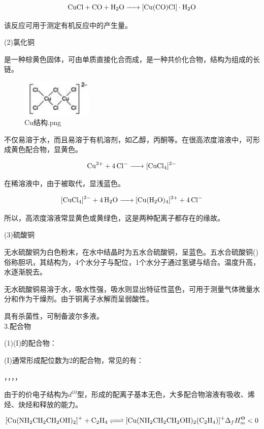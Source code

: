 \documentclass[a4paper,UTF8]{article}
\begin{document}
$$ \ce{CuCl + CO + H2O -> [Cu(CO)Cl]\cdot H2O} $$

该反应可用于测定有机反应中的产生量。

(2)氯化铜

是一种棕黄色固体，可由单质直接化合而成，是一种共价化合物，结构为组成的长链。

\begin{figure}[ht]
	\centering
	\includegraphics[width=0.3\textwidth]{figure//Cu结构.png}
	\caption{Cu结构.png}
	\label{fig:Cu结构}
\end{figure}

不仅易溶于水，而且易溶于有机溶剂，如乙醇，丙酮等。在很高浓度溶液中，可形成黄色配合物，显黄色。

$$ \ce{Cu^{2+} + 4Cl- -> [CuCl4]^{2-}} $$

在稀溶液中，由于被取代，显浅蓝色。

$$ \ce{[CuCl4]^{2-} + 4H2O -> [Cu(H2O)4]^{2+} + 4Cl-} $$

所以，高浓度溶液常显黄色或黄绿色，这是两种配离子都存在的缘故。

(3)硫酸铜

无水硫酸铜为白色粉末，在水中结晶时为五水合硫酸铜，呈蓝色。五水合硫酸铜()俗称胆巩，其结构为，4个水分子与配位，1个水分子通过氢键与结合。温度升高，水逐渐脱去。

无水硫酸铜易溶于水，吸水性强，吸水则显出特征性蓝色，可用于测量气体微量水分和作为干燥剂。由于铜离子水解而呈弱酸性。

具有杀菌性，可制备波尔多液。\\

3.配合物

(1)(I)的配合物：

(I)通常形成配位数为2的配合物，常见的有：

\ce{[Cu(SCN)2]+}，\ce{[CuCl2]-}，\ce{[Cu(NH3)2]+}，，\ce{[Cu(CN)2]-}

由于的价电子结构为$d^{10}$型，形成的配离子基本无色，大多配合物溶液有吸收、烯烃、炔烃和释放的能力。

$$ \ce{[Cu(NH2CH2CH2OH)2]+ + C2H4 <=> [Cu(NH2CH2CH2OH)2(C2H4)]+} \Delta _{f}H^{\Theta}_{m}<0$$
\end{document}
